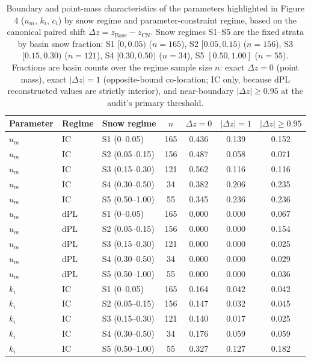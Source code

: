 \begin{table}[t]
\centering
\caption{Boundary and point-mass characteristics of the parameters highlighted in Figure 4 ($u_m$, $k_i$, $c_i$) by snow regime and parameter-constraint regime, based on the canonical paired shift $\Delta z = z_{\mathrm{Base}} - z_{\mathrm{CN}}$. Snow regimes S1--S5 are the fixed strata by basin snow fraction: S1 $[0, 0.05)$ ($n=165$), S2 $[0.05, 0.15)$ ($n=156$), S3 $[0.15, 0.30)$ ($n=121$), S4 $[0.30, 0.50)$ ($n=34$), S5 $[0.50, 1.00]$ ($n=55$). Fractions are basin counts over the regime sample size $n$: exact $\Delta z = 0$ (point mass), exact $|\Delta z| = 1$ (opposite-bound co-location; IC only, because dPL reconstructed values are strictly interior), and near-boundary $|\Delta z| \ge 0.95$ at the audit's primary threshold.}
\label{tab:tables5_boundary_point_mass}
\begin{threeparttable}
\begin{tabular}{lllcccc}
\toprule
Parameter & Regime & Snow regime & $n$ & $\Delta z = 0$ & $|\Delta z| = 1$ & $|\Delta z| \ge 0.95$ \\
\midrule
$u_m$ & IC & S1 (0–0.05) & 165 & 0.436 & 0.139 & 0.152 \\
$u_m$ & IC & S2 (0.05–0.15) & 156 & 0.487 & 0.058 & 0.071 \\
$u_m$ & IC & S3 (0.15–0.30) & 121 & 0.562 & 0.116 & 0.116 \\
$u_m$ & IC & S4 (0.30–0.50) & 34 & 0.382 & 0.206 & 0.235 \\
$u_m$ & IC & S5 (0.50–1.00) & 55 & 0.345 & 0.236 & 0.236 \\
$u_m$ & dPL & S1 (0–0.05) & 165 & 0.000 & 0.000 & 0.067 \\
$u_m$ & dPL & S2 (0.05–0.15) & 156 & 0.000 & 0.000 & 0.154 \\
$u_m$ & dPL & S3 (0.15–0.30) & 121 & 0.000 & 0.000 & 0.025 \\
$u_m$ & dPL & S4 (0.30–0.50) & 34 & 0.000 & 0.000 & 0.029 \\
$u_m$ & dPL & S5 (0.50–1.00) & 55 & 0.000 & 0.000 & 0.036 \\
$k_i$ & IC & S1 (0–0.05) & 165 & 0.164 & 0.042 & 0.042 \\
$k_i$ & IC & S2 (0.05–0.15) & 156 & 0.147 & 0.032 & 0.045 \\
$k_i$ & IC & S3 (0.15–0.30) & 121 & 0.140 & 0.017 & 0.025 \\
$k_i$ & IC & S4 (0.30–0.50) & 34 & 0.176 & 0.059 & 0.059 \\
$k_i$ & IC & S5 (0.50–1.00) & 55 & 0.327 & 0.127 & 0.182 \\

\end{tabular}
\end{threeparttable}
\end{table}
